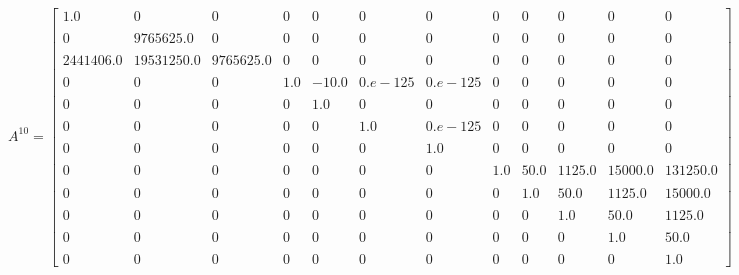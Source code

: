\documentclass[a4paper,12pt]{article}
\begin{document}
\begin{landscape}
	$$
	A^{10}=\begin{bmatrix}
	1.0	&	0	&	0	&	0	&	0	&	0	&	0	&	0	&	0	&	0	&	0	&	0\\\\
	0	&	9765625.0	&	0	&	0	&	0	&	0	&	0	&	0	&	0	&	0	&	0	&	0\\\\
	2441406.0	&	19531250.0	&	9765625.0	&	0	&	0	&	0	&	0	&	0	&	0	&	0	&	0	&	0\\\\
	0	&	0	&	0	&	1.0	&	-10.0	&	0.e-125	&	 0.e-125	&	0	&	0	&	0	&	0	&	0\\\\
	0	&	0	&	0	&	0	&	1.0	&	0	&	0	&	0	&	0	&	0	&	0	&	0\\\\
	0	&	0	&	0	&	0	&	0	&	1.0	&	0.e-125	&	0	&	0	&	0	&	0	&	0\\\\
	0	&	0	&	0	&	0	&	0	&	0	&	1.0	&	0	&	0	&	0	&	0	&	0\\\\
	0	&	0	&	0	&	0	&	0	&	0	&	0	&	1.0	&	50.0	&	1125.0	&	15000.0	&	131250.0\\\\
	0	&	0	&	0	&	0	&	0	&	0	&	0	&	0	&	1.0	&	50.0	&	1125.0	&	15000.0\\\\
	0	&	0	&	0	&	0	&	0	&	0	&	0	&	0	&	0	&	1.0	&	50.0	&	1125.0\\\\
	0	&	0	&	0	&	0	&	0	&	0	&	0	&	0	&	0	&	0	&	1.0	&	50.0\\\\
	0	&	0	&	0	&	0	&	0	&	0	&	0	&	0	&	0	&	0	&	0	&	1.0
	\end{bmatrix}	
	$$    
\end{landscape}
\end{document}
